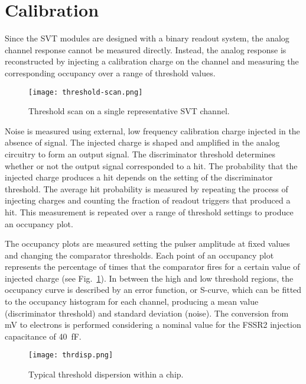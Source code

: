 \section{Calibration}

Since the SVT modules are designed with a binary readout system, the analog channel response cannot be measured directly. Instead, the analog response is reconstructed by injecting a calibration charge on the channel and measuring the corresponding occupancy over a range of threshold values. 

\begin{figure}[hbt] 
	\centering 
	\texttt{[image: threshold-scan.png]}
	\caption{Threshold scan on a single representative SVT channel.}
	\label{fig:threshold-scan}
\end{figure}

Noise is measured using external, low frequency calibration charge injected in the absence of signal. The injected charge is shaped and amplified in the analog circuitry to form an output signal. The discriminator threshold determines whether or not the output signal corresponded to a hit. The probability that the injected charge produces a hit depends on the setting of the discriminator threshold. The average hit probability is measured by repeating the process of injecting charges and counting the fraction of readout triggers that produced a hit. This measurement is repeated over a range of threshold settings to produce an occupancy plot. 

The occupancy plots are measured setting the pulser amplitude at fixed values and changing the comparator thresholds. Each point of an occupancy plot represents the percentage of times that the comparator fires for a certain value of injected charge (see Fig.~\ref{fig:threshold-scan}). In between the high and low threshold regions, the occupancy curve is described by an error function, or S-curve, which can be fitted to the occupancy histogram for each channel, producing a mean value (discriminator threshold) and standard deviation (noise). The conversion from mV to electrons is performed considering a nominal value for the FSSR2 injection capacitance of 40~fF. 

\begin{figure}[hbt] 
	\centering 
	\texttt{[image: thrdisp.png]}
	\caption{Typical threshold dispersion within a chip.}
	\label{fig:thrdisp}
\end{figure}

